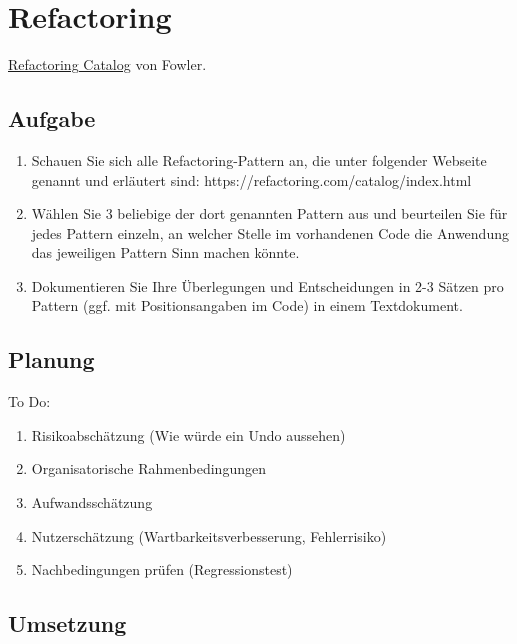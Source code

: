 \documentclass[a4paper]{article}
\title{\docTitle}
\author{Moritz}
\date{\today}
\begin{document}
\maketitle
\tableofcontents

\section{Refactoring}

\href{https://refactoring.com/catalog/index.html}{Refactoring Catalog} von Fowler.

\subsection{Aufgabe}

\begin{enumerate}
    \item Schauen Sie sich alle Refactoring-Pattern an, die unter folgender Webseite genannt und erläutert sind: https://refactoring.com/catalog/index.html
    \item Wählen Sie 3 beliebige der dort genannten Pattern aus und beurteilen Sie für jedes Pattern einzeln, an welcher Stelle im vorhandenen Code die Anwendung das jeweiligen Pattern Sinn machen könnte.
    \item Dokumentieren Sie Ihre Überlegungen und Entscheidungen in 2-3 Sätzen pro Pattern (ggf. mit Positionsangaben im Code) in einem Textdokument.
\end{enumerate}

\subsection{Planung}

To Do:

\begin{enumerate}
    \item Risikoabschätzung (Wie würde ein Undo aussehen)
    \item Organisatorische Rahmenbedingungen
    \item Aufwandsschätzung
    \item Nutzerschätzung (Wartbarkeitsverbesserung, Fehlerrisiko)
    \item Nachbedingungen prüfen (Regressionstest)
\end{enumerate}

\newpage
\subsection{Umsetzung}
\end{document}
